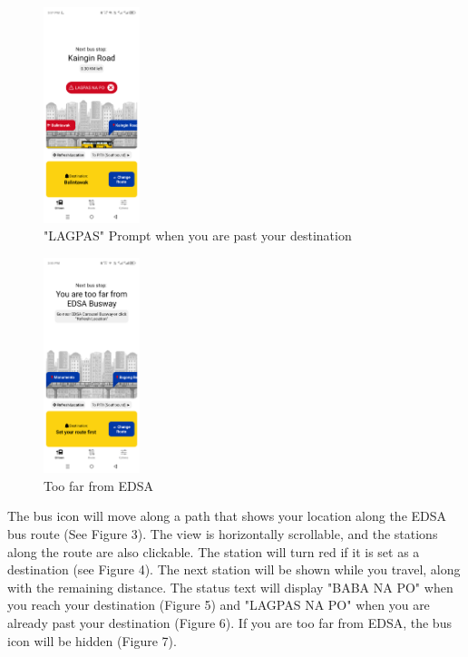 \documentclass[journal]{./IEEE/IEEEtran}
\begin{document}
\begin{figure}[htbp]
  \centering
  \includegraphics[width=0.25\textwidth]{ICS-template/screenshots/EDSAan_lagpas.png}
  \caption{"LAGPAS" Prompt when you are past your destination}
  \label{fig:yourlabel}
\end{figure}

\begin{figure}[htbp]
  \centering
  \includegraphics[width=0.25\textwidth]{ICS-template/screenshots/EDSAan_toofar.png}
  \caption{Too far from EDSA}
  \label{fig:yourlabel}
\end{figure}

The bus icon will move along a path that shows your location along the EDSA bus route (See Figure 3). The view is horizontally scrollable, and the stations along the route are also clickable. The station will turn red if it is set as a destination (see Figure 4). The next station will be shown while you travel, along with the remaining distance. The status text will display "BABA NA PO" when you reach your destination (Figure 5) and "LAGPAS NA PO" when you are already past your destination (Figure 6). If you are too far from EDSA, the bus icon will be hidden (Figure 7).
\end{document}
